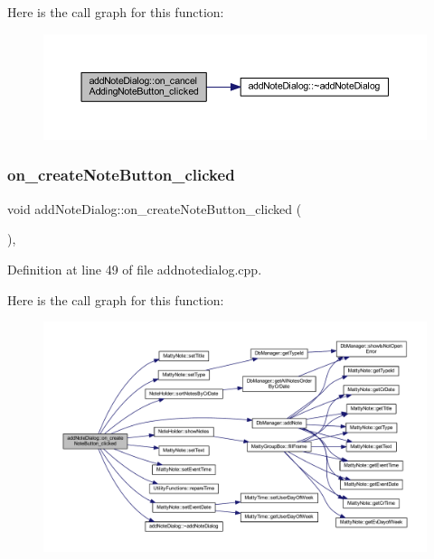Here is the call graph for this function\+:
\nopagebreak
\begin{figure}[H]
\begin{center}
\leavevmode
\includegraphics[width=350pt]{classaddNoteDialog_af0e53e8f605b12087a3982e53409ca2f_cgraph}
\end{center}
\end{figure}
\hypertarget{classaddNoteDialog_a67b28dc05851888a45774eb240d6e43d}{}\label{classaddNoteDialog_a67b28dc05851888a45774eb240d6e43d} 
\subsubsection{\texorpdfstring{on\+\_\+create\+Note\+Button\+\_\+clicked}{on\_createNoteButton\_clicked}}
{\footnotesize\ttfamily void add\+Note\+Dialog\+::on\+\_\+create\+Note\+Button\+\_\+clicked (\begin{DoxyParamCaption}{ }\end{DoxyParamCaption})\hspace{0.3cm}{\ttfamily [private]}, {\ttfamily [slot]}}



Definition at line 49 of file addnotedialog.\+cpp.

Here is the call graph for this function\+:
\nopagebreak
\begin{figure}[H]
\begin{center}
\leavevmode
\includegraphics[width=350pt]{classaddNoteDialog_a67b28dc05851888a45774eb240d6e43d_cgraph}
\end{center}
\end{figure}


